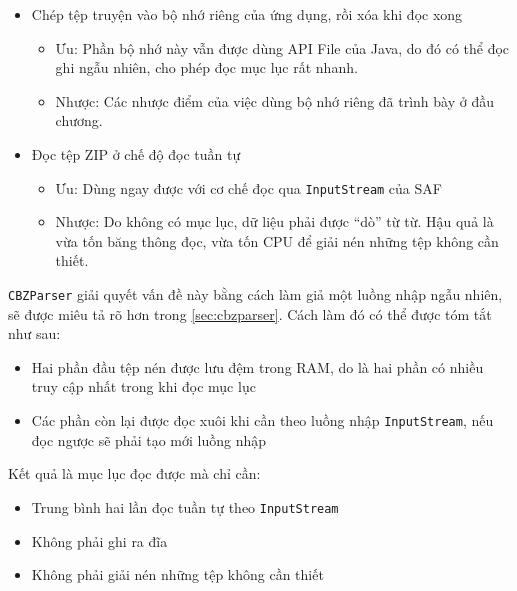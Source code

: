 \documentclass[../../../../thesis]{subfiles}
\begin{document}
\begin{itemize}
    \item
        Chép tệp truyện vào bộ nhớ riêng của ứng dụng, rồi xóa khi đọc xong

        \begin{itemize}
            \item
                Ưu: Phần bộ nhớ này vẫn được dùng API File của Java, do đó có
                thể đọc ghi ngẫu nhiên, cho phép đọc mục lục rất nhanh.
            \item
                Nhược: Các nhược điểm của việc dùng bộ nhớ riêng đã trình bày ở
                đầu chương.
        \end{itemize}
    \item
        Đọc tệp ZIP ở chế độ đọc tuần tự

        \begin{itemize}
            \item
                Ưu: Dùng ngay được với cơ chế đọc qua \texttt{InputStream} của
                SAF
            \item
                Nhược: Do không có mục lục, dữ liệu phải được ``dò'' từ từ. Hậu
                quả là vừa tốn băng thông đọc, vừa tốn CPU để giải nén những tệp
                không cần thiết.
        \end{itemize}
\end{itemize}

\texttt{CBZParser} giải quyết vấn đề này bằng cách làm giả một luồng nhập ngẫu
nhiên, sẽ được miêu tả rõ hơn trong \autoref{sec:cbzparser}. Cách làm đó có thể
được tóm tắt như sau:

\begin{itemize}
    \item
        Hai phần đầu tệp nén được lưu đệm trong RAM, do là hai phần có nhiều
        truy cập nhất trong khi đọc mục lục
    \item
        Các phần còn lại được đọc xuôi khi cần theo luồng nhập
        \texttt{InputStream}, nếu đọc ngược sẽ phải tạo mới luồng nhập
\end{itemize}

Kết quả là mục lục đọc được mà chỉ cần:

\begin{itemize}
    \item
        Trung bình hai lần đọc tuần tự theo \texttt{InputStream}
    \item
        Không phải ghi ra đĩa
    \item
        Không phải giải nén những tệp không cần thiết
\end{itemize}
\end{document}
